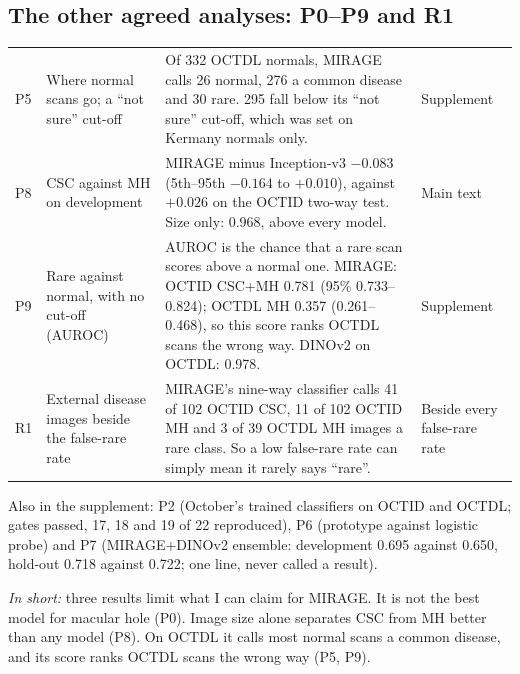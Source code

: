 \documentclass[10pt,a4paper]{article}
\newenvironment{parts}{\begin{description}[style=unboxed, leftmargin=0pt, itemsep=3pt, font=\normalfont\bfseries\itshape]}{\end{description}}
\newenvironment{topic}[2]{\subsection{#1}\label{#2}\begin{parts}}{\end{parts}}
\begin{document}
\begin{topic}{The other agreed analyses: P0--P9 and R1}{sec:pr}
{\begin{tabularx}{\linewidth}{@{}l P{3.1cm} Y P{1.7cm}@{}}
P5 & Where normal scans go; a ``not sure'' cut-off & Of 332 OCTDL normals, MIRAGE calls 26 normal, 276 a common
disease and 30 rare. 295 fall below its ``not sure'' cut-off, which was set on Kermany normals only. &
Supplement \\
P8 & CSC against MH on development & MIRAGE minus Inception-v3 $-0.083$ (5th--95th $-0.164$ to $+0.010$),
against $+0.026$ on the OCTID two-way test. Size only: 0.968, above every model. & Main text \\
P9 & Rare against normal, with no cut-off (AUROC) & AUROC is the chance that a rare scan scores above a normal
one. MIRAGE: OCTID CSC+MH 0.781 (95\% 0.733--0.824); OCTDL MH 0.357 (0.261--0.468), so this score ranks OCTDL scans
the wrong way. DINOv2 on OCTDL: 0.978. & Supplement \\
R1 & External disease images beside the false-rare rate & MIRAGE's nine-way classifier calls 41 of 102 OCTID
CSC, 11 of 102 OCTID MH and 3 of 39 OCTDL MH images a rare class. So a low false-rare rate can simply mean it
rarely says ``rare''. & Beside every false-rare rate \\
\bottomrule
\end{tabularx}}

\smallskip
\noindent
Also in the supplement: P2 (October's trained classifiers on OCTID and OCTDL; gates passed, 17, 18 and 19 of 22
reproduced), P6 (prototype against logistic probe) and P7 (MIRAGE+DINOv2 ensemble: development 0.695 against
0.650, hold-out 0.718 against 0.722; one line, never called a result).

\smallskip
\noindent
\emph{In short:} three results limit what I can claim for MIRAGE. It is not the best model for macular hole (P0).
Image size alone separates CSC from MH better than any model (P8). On OCTDL it calls most normal scans a common
disease, and its score ranks OCTDL scans the wrong way (P5, P9).
\end{topic}
\end{document}
